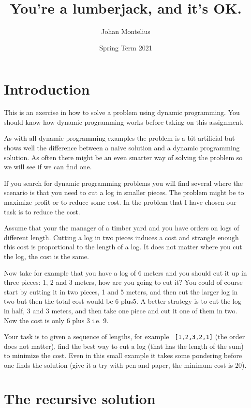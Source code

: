 \documentclass[a4paper,11pt]{article}
\begin{document}
\title{
    \textbf{You're a lumberjack, and it's OK.}
}
\author{Johan Montelius}
\date{Spring Term 2021}
\maketitle
{}

\section*{Introduction}

This is an exercise in how to solve a problem using dynamic
programming. You should know how dynamic programming works before
taking on this assignment.

As with all dynamic programming examples the problem is a bit
artificial but shows well the difference between a naive solution and
a dynamic programming solution. As often there might be an even
smarter way of solving the problem so we will see if we can find one.

If you search for dynamic programming problems you will find several
where the scenario is that you need to cut a log in smaller
pieces. The problem might be to maximize profit or to reduce some
cost. In the problem that I have chosen our task is to reduce the cost.

Assume that your the manager of a timber yard and you have orders on
logs of different length. Cutting a log in two pieces induces a cost
and strangle enough this cost is proportional to the length of a
log. It does not matter where you cut the log, the cost is the same.

Now take for example that you have a log of 6 meters and you should
cut it up in three pieces: 1, 2 and 3 meters, how are you going to cut
it? You could of course start by cutting it in two pieces, 1 and 5
meters, and then cut the larger log in two but then the total cost
would be 6 plus5. A better strategy is to cut the log in half, 3 and 3
meters, and then take one piece and cut it one of them in two. Now the
cost is only 6 plus 3 i.e. 9.

Your task is to given a sequence of lengths, for example {\tt
  [1,2,3,2,1]} (the order does not matter), find the best way to cut a
log (that has the length of the sum) to minimize the cost. Even in
this small example it takes some pondering before one finds the
solution (give it a try with pen and paper, the minimum cost is 20).


\section*{The recursive solution}
\end{document}
